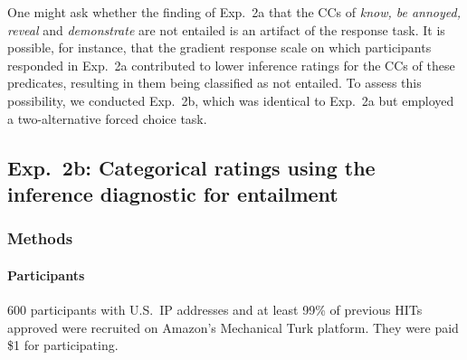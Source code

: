 \documentclass[11pt,fleqn]{article}
\newcommand{\6}{\mbox{$[\hspace*{-.6mm}[$}}
\newcommand{\9}{\mbox{$]\hspace*{-.6mm}]$}}
\begin{document}

One might ask whether the finding of Exp.~2a that the CCs of {\em know, be annoyed, reveal} and {\em demonstrate} are not entailed is an artifact of the response task. It is possible, for instance, that the gradient response scale on which participants responded in Exp.~2a contributed to lower inference ratings for the CCs of these predicates, resulting in them being classified as not entailed. To assess this possibility, we conducted Exp.~2b, which was identical to Exp.~2a but employed a two-alternative forced choice task.

\subsection{Exp.~2b: Categorical ratings using the inference diagnostic for entailment}

\subsubsection{Methods}

\paragraph{Participants} 600 participants with U.S.\ IP addresses and at least 99\% of previous HITs approved were recruited on Amazon's Mechanical Turk platform. They were paid \$1 for participating.
\end{document}
